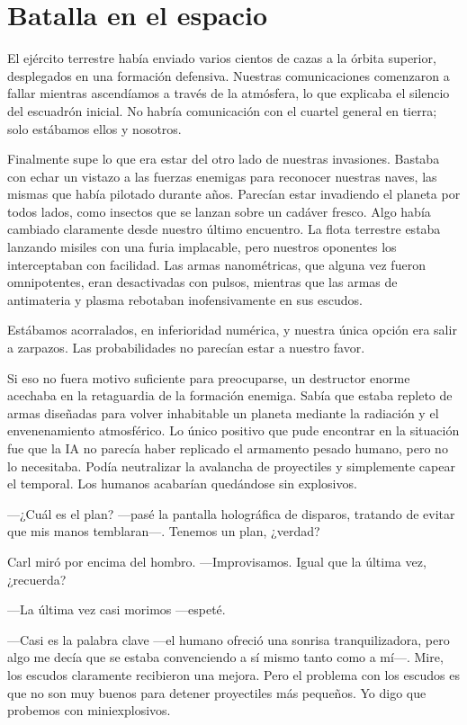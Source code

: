 \chapter{Batalla en el espacio}\label{sec:batalla-en-el-espacio}

El ejército terrestre había enviado varios cientos de cazas a la órbita superior, desplegados en una formación defensiva. Nuestras comunicaciones comenzaron a fallar mientras ascendíamos a través de la atmósfera, lo que explicaba el silencio del escuadrón inicial. No habría comunicación con el cuartel general en tierra; solo estábamos ellos y nosotros.

Finalmente supe lo que era estar del otro lado de nuestras invasiones. Bastaba con echar un vistazo a las fuerzas enemigas para reconocer nuestras naves, las mismas que había pilotado durante años. Parecían estar invadiendo el planeta por todos lados, como insectos que se lanzan sobre un cadáver fresco. Algo había cambiado claramente desde nuestro último encuentro. La flota terrestre estaba lanzando misiles con una furia implacable, pero nuestros oponentes los interceptaban con facilidad. Las armas nanométricas, que alguna vez fueron omnipotentes, eran desactivadas con pulsos, mientras que las armas de antimateria y plasma rebotaban inofensivamente en sus escudos.

Estábamos acorralados, en inferioridad numérica, y nuestra única opción era salir a zarpazos. Las probabilidades no parecían estar a nuestro favor.

Si eso no fuera motivo suficiente para preocuparse, un destructor enorme acechaba en la retaguardia de la formación enemiga. Sabía que estaba repleto de armas diseñadas para volver inhabitable un planeta mediante la radiación y el envenenamiento atmosférico. Lo único positivo que pude encontrar en la situación fue que la IA no parecía haber replicado el armamento pesado humano, pero no lo necesitaba. Podía neutralizar la avalancha de proyectiles y simplemente capear el temporal. Los humanos acabarían quedándose sin explosivos.

 —¿Cuál es el plan? —pasé la pantalla holográfica de disparos, tratando de evitar que mis manos temblaran—. Tenemos un plan, ¿verdad?

Carl miró por encima del hombro. —Improvisamos. Igual que la última vez, ¿recuerda?

—La última vez casi morimos —espeté.

—Casi es la palabra clave —el humano ofreció una sonrisa tranquilizadora, pero algo me decía que se estaba convenciendo a sí mismo tanto como a mí—. Mire, los escudos claramente recibieron una mejora. Pero el problema con los escudos es que no son muy buenos para detener proyectiles más pequeños. Yo digo que probemos con miniexplosivos.

